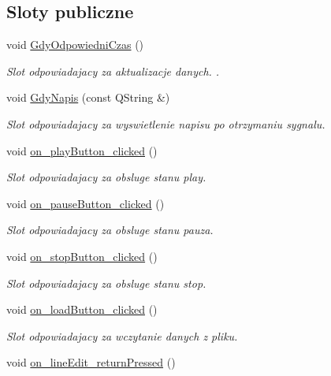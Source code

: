 \subsection*{Sloty publiczne}
\begin{DoxyCompactItemize}
\item 
void \hyperlink{class_okno_glowne_a2a49d3696ef8a42325313842768f2c92}{Gdy\-Odpowiedni\-Czas} ()
\begin{DoxyCompactList}\small\item\em Slot odpowiadajacy za aktualizacje danych. . \end{DoxyCompactList}\item 
void \hyperlink{class_okno_glowne_a2a59f13292adfead4ac821780220044a}{Gdy\-Napis} (const Q\-String \&)
\begin{DoxyCompactList}\small\item\em Slot odpowiadajacy za wyswietlenie napisu po otrzymaniu sygnalu. \end{DoxyCompactList}\item 
void \hyperlink{class_okno_glowne_ac837b1f8c8b0288d07987e059966431b}{on\-\_\-play\-Button\-\_\-clicked} ()
\begin{DoxyCompactList}\small\item\em Slot odpowiadajacy za obsluge stanu play. \end{DoxyCompactList}\item 
void \hyperlink{class_okno_glowne_ae8bd560de9aa835ba8b194b8f7da094c}{on\-\_\-pause\-Button\-\_\-clicked} ()
\begin{DoxyCompactList}\small\item\em Slot odpowiadajacy za obsluge stanu pauza. \end{DoxyCompactList}\item 
void \hyperlink{class_okno_glowne_a63255adc6263a1ee6f67c96b91446b73}{on\-\_\-stop\-Button\-\_\-clicked} ()
\begin{DoxyCompactList}\small\item\em Slot odpowiadajacy za obsluge stanu stop. \end{DoxyCompactList}\item 
void \hyperlink{class_okno_glowne_aba5accbf5e231ba194ee0e966b8d7b15}{on\-\_\-load\-Button\-\_\-clicked} ()
\begin{DoxyCompactList}\small\item\em Slot odpowiadajacy za wczytanie danych z pliku. \end{DoxyCompactList}\item 
void \hyperlink{class_okno_glowne_a0c744f19fcf0e4bcd04a49502864e020}{on\-\_\-line\-Edit\-\_\-return\-Pressed} ()

\end{DoxyCompactItemize}
